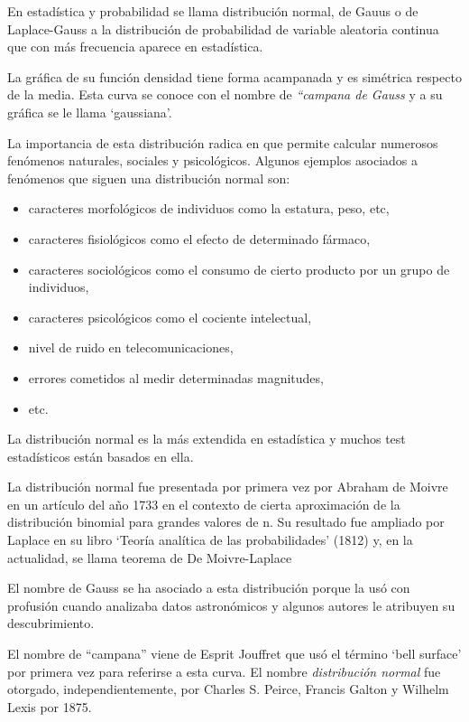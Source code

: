 En estadística y probabilidad se llama distribución normal, de Gauus o de  Laplace-Gauss a la  distribución de probabilidad de variable aleatoria continua que con más frecuencia aparece en estadística.

La gráfica de su función densidad tiene forma acampanada y es simétrica respecto de la media. Esta curva se conoce con el nombre de \emph{``campana de Gauss} y a su gráfica se le llama `gaussiana'.

La importancia de esta distribución radica en que permite calcular numerosos fenómenos naturales, sociales y psicológicos. Algunos ejemplos asociados a fenómenos que siguen una distribución normal son:


\vspace{-3mm} \begin{itemize}
\vspace{-3mm} \item caracteres morfológicos de individuos como la estatura, peso, etc,
\vspace{-3mm} \item caracteres fisiológicos como el efecto de determinado fármaco,
\vspace{-3mm} \item caracteres sociológicos como el consumo de cierto producto por un grupo de individuos, 
\vspace{-3mm} \item  caracteres psicológicos como el cociente intelectual, 
\vspace{-3mm} \item  nivel de ruido en telecomunicaciones,
\vspace{-3mm} \item errores cometidos al medir determinadas magnitudes,
\vspace{-3mm} \item etc.
\vspace{-3mm} \end{itemize}

La distribución normal es la más extendida en estadística y muchos test estadísticos están basados en ella. 

\vspace{0.4mm}%
\begin{small}
\textcolor{gris}{La distribución normal fue presentada por primera vez por Abraham de Moivre en un artículo del año 1733 en el contexto de cierta aproximación de la distribución binomial para grandes valores de n. Su resultado fue ampliado por Laplace en su libro `Teoría analítica de las probabilidades' (1812) y, en la actualidad, se llama teorema de De Moivre-Laplace}

\textcolor{gris}{El nombre de Gauss se ha asociado a esta distribución porque la usó con profusión cuando analizaba datos astronómicos y algunos autores le atribuyen su descubrimiento.}

\textcolor{gris}{ El nombre de ``campana'' viene de Esprit Jouffret que usó el término `bell surface' por primera vez para referirse a esta curva. El nombre \emph{distribución normal} fue otorgado, independientemente, por Charles S. Peirce, Francis Galton y Wilhelm Lexis por 1875.}
\end{small}


